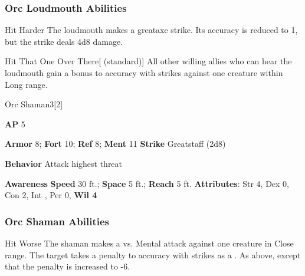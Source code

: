 \subsubsection{Orc Loudmouth Abilities}

\begin{ability}{Hit Harder}
The loudmouth makes a greataxe strike.
Its accuracy is reduced to 1, but the strike deals 4d8 damage.
\end{ability}

\vspace{0.5em}
\begin{ability}{Hit That One Over There}[ (standard)]
All other willing allies who can hear the loudmouth gain a  bonus to accuracy with strikes against one creature within Long range.
\end{ability}

\begin{monsection}{Orc Shaman}{3}[2]
\vspace{-1em}\vspace{-1em}
\begin{spellcontent}
\begin{spelltargetinginfo}
{\textbf{AP} 5}

\pari \textbf{Armor} 8;
\textbf{Fort} 10;
\textbf{Ref} 8;
\textbf{Ment} 11
\pari \textbf{Strike} Greatstaff  (2d8)



\pari \textbf{Behavior} Attack highest threat
\end{spelltargetinginfo}
\end{spellcontent}

\begin{monsterfooter}
\pari \textbf{Awareness} 
\pari \textbf{Speed} 30 ft.;
\textbf{Space} 5 ft.;
\textbf{Reach} 5 ft.
\pari \textbf{Attributes}:
Str 4,
Dex 0,
Con 2,
Int ,
Per 0,
\textbf{Wil 4}
\end{monsterfooter}
\end{monsection}


\subsubsection{Orc Shaman Abilities}

\begin{ability}{Hit Worse}
The shaman makes a  vs. Mental attack against one creature in Close range.
\hit The target takes a  penalty to accuracy with strikes as a .
\crit As above, except that the penalty is increased to -6.
\end{ability}

